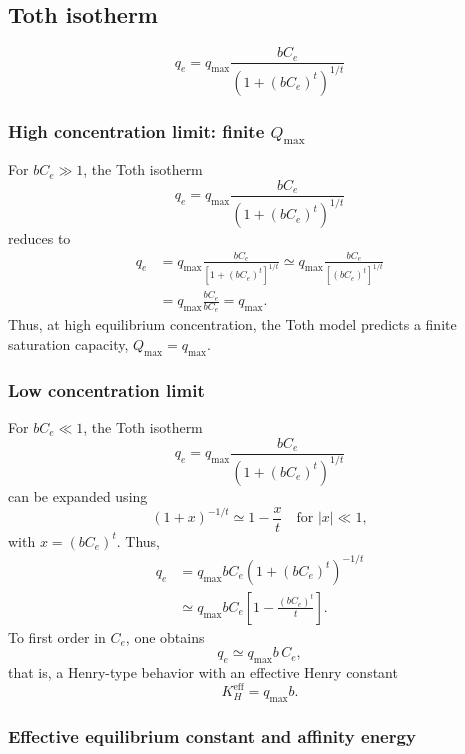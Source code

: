 	
	\subsection{Toth isotherm}
	\[
	q_e = q_{\max} \frac{b C_e}{\left(1 + (b C_e)^{t}\right)^{1/t}}
	\]
	
	\subsubsection{High concentration limit: finite $Q_{\max}$}
	
	For $b C_e \gg 1$, the Toth isotherm
	\[
	q_e = q_{\max} \frac{b C_e}{\left(1 + (b C_e)^{t}\right)^{1/t}}
	\]
	reduces to
	\begin{align}
		q_e 
		&= q_{\max} \frac{b C_e}{\left[1 + (b C_e)^{t}\right]^{1/t}}
		\simeq q_{\max} \frac{b C_e}{\left[(b C_e)^{t}\right]^{1/t}} \nonumber \\
		&= q_{\max} \frac{b C_e}{b C_e}
		= q_{\max}.
	\end{align}
	Thus, at high equilibrium concentration, the Toth model predicts a finite saturation capacity, $Q_{\max} = q_{\max}$.
	
	\subsubsection{Low concentration limit}
	
	For $b C_e \ll 1$, the Toth isotherm
	\[
	q_e = q_{\max} \frac{b C_e}{\left(1 + (b C_e)^{t}\right)^{1/t}}
	\]
	can be expanded using
	\[
	\left(1 + x\right)^{-1/t} \simeq 1 - \frac{x}{t} \quad \text{for } |x| \ll 1,
	\]
	with $x = (b C_e)^{t}$. Thus,
	\begin{align}
		q_e
		&= q_{\max} b C_e \left(1 + (b C_e)^{t}\right)^{-1/t} \nonumber \\
		&\simeq q_{\max} b C_e \left[1 - \frac{(b C_e)^{t}}{t}\right].
	\end{align}
	To first order in $C_e$, one obtains
	\begin{equation}
		q_e \simeq q_{\max} b\, C_e,
	\end{equation}
	that is, a Henry-type behavior with an effective Henry constant
	\begin{equation}
		K_H^{\mathrm{eff}} = q_{\max} b.
	\end{equation}

	\subsubsection{Effective equilibrium constant and affinity energy}

